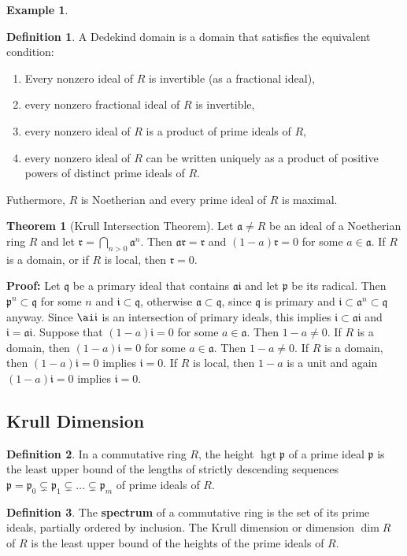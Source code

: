 \documentclass[11pt]{amsbook}%
\newcommand{\ii}{\item}
\theoremstyle{plain}
\theoremstyle{definition}
\newtheorem{definition*}{Definition}
\newtheorem*{example*}{Example}
\newtheorem{theorem}{Theorem}
\numberwithin{equation}{section}
\newcommand{\af}{\mathfrak a}
\newcommand{\rf}{\mathfrak r}
\newcommand{\pf}{\mathfrak p}
\newcommand{\ifr}{\mathfrak i}
\newcommand{\qf}{\mathfrak q}
\renewcommand{\proof}{ \textbf{Proof: }}
\DeclareMathOperator{\hgt}{hgt}
\begin{document}
\begin{example*}
\begin{definition*}
  A Dedekind domain is a domain that satisfies the equivalent condition:
  \begin{enumerate}[1. ]
      \ii Every nonzero ideal of $R$ is invertible (as a fractional ideal),
      \ii every nonzero fractional ideal of $R$ is invertible,
      \ii every nonzero ideal of $R$ is a product of prime ideals of $R$,
      \ii every nonzero ideal of $R$ can be written uniquely as a product of positive
      powers of distinct prime ideals of $R$.
  \end{enumerate}
  Futhermore, $R$ is Noetherian and every prime ideal of $R$ is maximal.
\end{definition*}

\begin{theorem}[Krull Intersection Theorem]
  Let $\af \neq R$ be an ideal of a Noetherian ring $R$ and let $\rf = \bigcap_{n > 0} \af^{n}$.
  Then $\af\rf = \rf$ and $(1-a)\rf = 0$ for some $a \in \af$. If $R$ is a domain,
  or if $R$ is local, then $\rf = 0$.
\end{theorem} \vspace{1.8em}
\proof Let $\qf$ be a primary ideal that contains $\af\ifr$ and let $\pf$ be its radical.
Then $\pf^{n} \subset \qf$ for some $n$ and $\ifr \subset \qf$, otherwise $\af \subset \qf$, since
$\qf$ is primary and $\ifr \subset \af^{n} \subset \qf$ anyway. Since $\ai\ifr$ is an
intersection of primary ideals, this implies $\ifr \subset \af\ifr$ and $\ifr = \af\ifr$.
Suppose that $(1-a)\ifr = 0$ for some $a \in \af$. Then $1-a \neq 0$. If $R$ is a domain,
then $(1-a)\ifr = 0$ for some $a \in \af$. Then $1-a \neq 0$. If $R$ is a domain, then
$(1-a)\ifr = 0$ implies $\ifr = 0$. If $R$ is local, then $1-a$ is a unit and
again $(1-a)\ifr = 0$ implies $\ifr = 0$. \qedsymbol

\subsection{Krull Dimension}
\begin{definition*}
  In a commutative ring $R$, the height $\hgt \pf$ of a prime ideal $\pf$ is
  the least upper bound of the lengths of strictly descending sequences
  $\pf = \pf_{0} \subsetneq \pf_{1} \subsetneq \dots \subsetneq \pf_{m}$
  of prime ideals of $R$.
\end{definition*}

\begin{definition*}
  \label{def-spectrum-ring}
  The \textbf{spectrum} of a commutative ring is the set of its prime ideals,
  partially ordered by inclusion. The Krull dimension or dimension $\dim R$ of $R$
  is the least upper bound of the heights of the prime ideals of $R$.
\end{definition*}


\end{example*}
\end{document}
